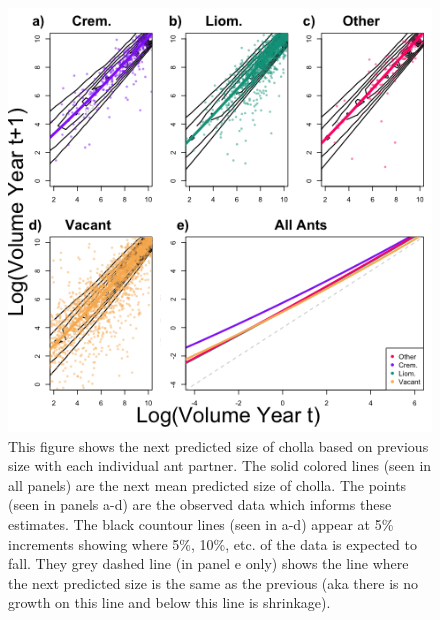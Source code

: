 \documentclass[11pt]{article}
\begin{document}
\begin{figure}
	\includegraphics[width = 0.95\linewidth]{Figures/GrowContourLinesColor.png}
	\caption{This figure shows the next predicted size of cholla based on previous size with each individual ant partner. The solid colored lines (seen in all panels) are the next mean predicted size of cholla. The points (seen in panels a-d) are the observed data which informs these estimates. The black countour lines (seen in a-d) appear at 5\% increments showing where 5\%, 10\%, etc. of the data is expected to fall. They grey dashed line (in panel e only) shows the line where the next predicted size is the same as the previous (aka there is no growth on this line and below this line is shrinkage). }
	\label{fig:Grow}
\end{figure}
\end{document}
